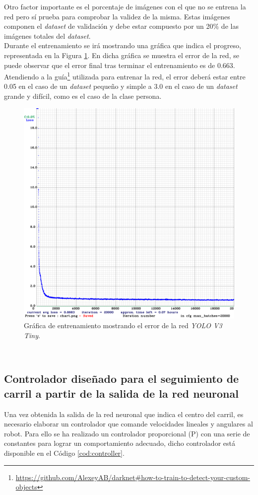 Otro factor importante es el porcentaje de imágenes con el que no se entrena la red pero sí prueba para comprobar la validez de la misma. Estas imágenes componen el \textit{dataset} de validación y debe estar compuesto por un 20\% de las imágenes totales del \textit{dataset}.\\

Durante el entrenamiento se irá mostrando una gráfica que indica el progreso, representada en la Figura \ref{fig:chart}. En dicha gráfica se muestra el error de la red, se puede observar que el error final tras terminar el entrenamiento es de 0.663. Atendiendo a la guía\footnote{\url{https://github.com/AlexeyAB/darknet\#how-to-train-to-detect-your-custom-objects}} utilizada para entrenar la red, el error deberá estar entre 0.05 en el caso de un \textit{dataset} pequeño y simple a 3.0 en el caso de un \textit{dataset} grande y difícil, como es el caso de la clase persona.\\

\begin{figure} [h!]
	\begin{center}
		\includegraphics[width=12cm]{figs/chart}
	\end{center}
	\caption{Gráfica de entrenamiento mostrando el error de la red \textit{YOLO V3 Tiny}.}
	\label{fig:chart}
\end{figure}\

\subsection{Controlador diseñado para el seguimiento de carril a partir de la salida de la red neuronal}
Una vez obtenida la salida de la red neuronal que indica el centro del carril, es necesario elaborar un controlador que comande velocidades lineales y angulares al robot. Para ello se ha realizado un controlador proporcional (P) con una serie de constantes para lograr un comportamiento adecuado, dicho controlador está disponible en el Código \ref{cod:controller}.\\ 


